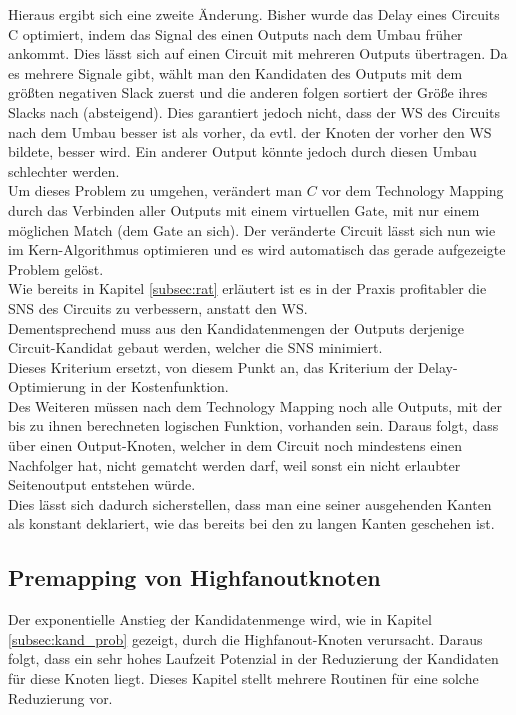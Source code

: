 \documentclass[11pt, a4paper, german]{article}
\newcommand{\TM}{Technology  Mapping }
\begin{document}
Hieraus ergibt sich eine zweite Änderung. Bisher wurde das Delay eines Circuits C optimiert, indem das Signal des einen Outputs nach dem Umbau früher ankommt. Dies lässt sich auf einen Circuit mit mehreren Outputs übertragen. Da es mehrere Signale gibt, wählt man den Kandidaten des Outputs mit dem größten negativen Slack zuerst und die anderen folgen sortiert der Größe ihres Slacks nach (absteigend). Dies garantiert jedoch nicht, dass der WS des Circuits nach dem Umbau besser ist als vorher, da evtl. der Knoten der vorher den WS bildete, besser wird. Ein anderer Output könnte jedoch durch diesen Umbau schlechter werden. \\
Um dieses Problem zu umgehen, verändert man $C$ vor dem \TM durch das Verbinden aller Outputs mit einem virtuellen Gate, mit nur einem möglichen Match (dem Gate an sich). Der veränderte Circuit lässt sich nun wie im Kern-Algorithmus optimieren und es wird automatisch das gerade aufgezeigte Problem gelöst.\\ 
Wie bereits in Kapitel \ref{subsec:rat}  erläutert ist es in der Praxis profitabler die SNS des Circuits zu verbessern, anstatt den WS.\\
Dementsprechend muss aus den Kandidatenmengen der Outputs derjenige Circuit-Kandidat gebaut werden, welcher die SNS minimiert.\\
Dieses Kriterium ersetzt, von diesem Punkt an,  das Kriterium der Delay-Optimierung in der Kostenfunktion.\\
 
Des Weiteren müssen nach dem \TM noch alle Outputs, mit der bis zu ihnen berechneten logischen Funktion, vorhanden sein. Daraus folgt, dass über einen Output-Knoten, welcher in dem Circuit noch mindestens einen Nachfolger hat, nicht gematcht werden darf, weil sonst ein nicht erlaubter Seitenoutput entstehen würde.\\
 Dies lässt sich dadurch sicherstellen, dass man eine seiner ausgehenden Kanten als konstant deklariert, wie das bereits bei den zu langen Kanten geschehen ist. 

 \subsection{Premapping von Highfanoutknoten}
 \label{sec:premapping}
Der exponentielle Anstieg der Kandidatenmenge wird, wie in Kapitel \ref{subsec:kand_prob} gezeigt, durch die Highfanout-Knoten verursacht. Daraus folgt, dass ein sehr hohes Laufzeit Potenzial in der Reduzierung der Kandidaten für diese Knoten liegt. Dieses Kapitel stellt mehrere Routinen für eine solche Reduzierung vor.\\
\end{document}
